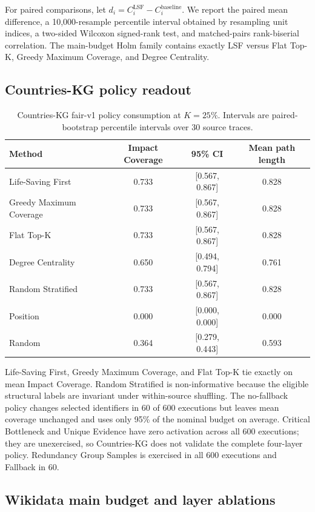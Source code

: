 \documentclass[pdflatex,sn-basic]{sn-jnl}
\begin{document}
For paired comparisons, let $d_i=C_i^{\mathrm{LSF}}-C_i^{\mathrm{baseline}}$. We report the paired mean difference, a 10,000-resample percentile interval obtained by resampling unit indices, a two-sided Wilcoxon signed-rank test, and matched-pairs rank-biserial correlation. The main-budget Holm family contains exactly LSF versus Flat Top-K, Greedy Maximum Coverage, and Degree Centrality.

\subsection{Countries-KG policy readout}

\begin{table}[ht]
\caption{Countries-KG fair-v1 policy consumption at $K=25\%$. Intervals are paired-bootstrap percentile intervals over 30 source traces.}
\label{tab:supp-countries-fair}
\centering
\small
\begin{tabular}{lccc}
\toprule
Method & Impact Coverage & 95\% CI & Mean path length \\
\midrule
Life-Saving First & 0.733 & [0.567, 0.867] & 0.828 \\
Greedy Maximum Coverage & 0.733 & [0.567, 0.867] & 0.828 \\
Flat Top-K & 0.733 & [0.567, 0.867] & 0.828 \\
Degree Centrality & 0.650 & [0.494, 0.794] & 0.761 \\
Random Stratified & 0.733 & [0.567, 0.867] & 0.828 \\
Position & 0.000 & [0.000, 0.000] & 0.000 \\
Random & 0.364 & [0.279, 0.443] & 0.593 \\
\bottomrule
\end{tabular}
\end{table}

Life-Saving First, Greedy Maximum Coverage, and Flat Top-K tie exactly on mean Impact Coverage. Random Stratified is non-informative because the eligible structural labels are invariant under within-source shuffling. The no-fallback policy changes selected identifiers in 60 of 600 executions but leaves mean coverage unchanged and uses only 95\% of the nominal budget on average. Critical Bottleneck and Unique Evidence have zero activation across all 600 executions; they are unexercised, so Countries-KG does not validate the complete four-layer policy. Redundancy Group Samples is exercised in all 600 executions and Fallback in 60.

\subsection{Wikidata main budget and layer ablations}
\end{document}
